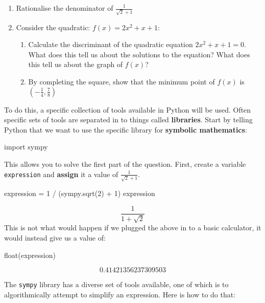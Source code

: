 \begin{enumerate}

\item 
Rationalise the denominator of \(\frac{1}{\sqrt{2} + 1}\)

\item 
Consider the quadratic: \(f(x)=2x ^ 2 + x + 1\):

\begin{enumerate}

\item Calculate the discriminant of the quadratic equation \(2x ^ 2 + x + 1 =
0\). What does this tell us about the solutions to the equation? What
does this tell us about the graph of \(f(x)\)?

\item By completing the square, show that the minimum point of \(f(x)\) is
\(\left(-\frac{1}{4}, \frac{7}{8}\right)\)

\end{enumerate}

\end{enumerate}


To do this, a specific collection of tools available in Python will be used.
Often specific sets of tools are separated in to things called \textbf{libraries}. 
Start by telling Python that we want to use the specific library for \textbf{symbolic
mathematics}:

\begin{pyin}
import sympy
\end{pyin}

This allows you to solve the first part of the question. First, create a
variable \texttt{expression} and \textbf{assign} it a value of \(\frac{1}{\sqrt{2} + 1}\).

\begin{pyin}
expression = 1 / (sympy.sqrt(2) + 1)
expression
\end{pyin}

\[\frac{1}{1 + \sqrt{2}}\]
This is not what would happen if we plugged the above in to a basic calculator,
it would instead give us a value of:


\begin{pyin}
float(expression)
\end{pyin}

\[0.41421356237309503\]

The \texttt{sympy} library has a diverse set of tools available, one of which is to
algorithmically attempt to simplify an expression. Here is how to do that:

